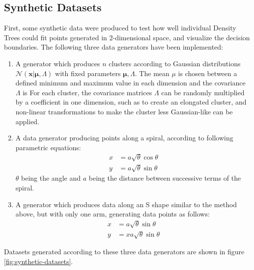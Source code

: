\documentclass[10pt]{article}
\begin{document}
\subsection{Synthetic Datasets}
\label{subsec:data-synthetic}
First, some synthetic data were produced to test how well individual Density Trees could fit points generated in 2-dimensional space, and visualize the decision boundaries. The following three data generators have been implemented:
\begin{enumerate}
    \item A generator which produces $n$ clusters according to Gaussian distributions $\mathcal{N}(\mathbf{x}|\boldsymbol{\mu},\mathtt{\Lambda})$ with fixed parameters $\boldsymbol{\mu},\mathtt{\Lambda}$. The mean $\mu$ is chosen between a defined minimum and maximum value in each dimension and the covariance $\Lambda$ is  For each cluster, the covariance matrices $\Lambda$ can be randomly multiplied by a coefficient in one dimension, such as to create an elongated cluster, and non-linear transformations to make the cluster less Gaussian-like can be applied.
    \item A data generator producing points along a spiral, according to following parametric equations:
    \begin{equation}
        \begin{aligned}
            x &= a\sqrt{\theta}\cos\theta\\
            y &= a\sqrt{\theta}\sin\theta
        \end{aligned}
    \end{equation}
    $\theta$  being the angle and $a$ being the distance between successive terms of the spiral.
    \item A generator which produces data along an S shape similar to the method above, but with only one arm, generating data points as follows:
    \begin{equation}
        \begin{aligned}
            x &= a\sqrt{\theta}\sin\theta\\
            y &= xa\sqrt{\theta}\sin\theta
        \end{aligned}
    \end{equation}
\end{enumerate}

Datasets generated according to these three data generators are shown in figure \ref{fig:synthetic-datasets}.
\end{document}

